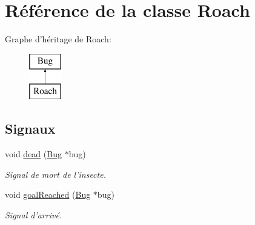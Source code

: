 \hypertarget{classRoach}{
\section{Référence de la classe Roach}
\label{classRoach}
}
Graphe d'héritage de Roach:\begin{figure}[H]
\begin{center}
\leavevmode
\includegraphics[height=2.000000cm]{classRoach}
\end{center}
\end{figure}
\subsection*{Signaux}
\begin{DoxyCompactItemize}
\item 
void \hyperlink{classBug_ab7379f5a0172e2d536e20f3f29915e02}{dead} (\hyperlink{classBug}{Bug} $\ast$bug)
\begin{DoxyCompactList}\small\item\em Signal de mort de l'insecte. \end{DoxyCompactList}\item 
void \hyperlink{classBug_a33f90dffa55e1dce80dc2416c75a53c8}{goalReached} (\hyperlink{classBug}{Bug} $\ast$bug)
\begin{DoxyCompactList}\small\item\em Signal d'arrivé. \end{DoxyCompactList}\end{DoxyCompactItemize}
